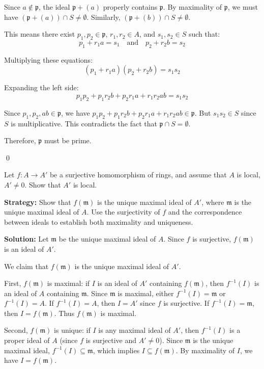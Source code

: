 Since $a \notin \mathfrak{p}$, the ideal $\mathfrak{p} + (a)$ properly contains $\mathfrak{p}$. By maximality of $\mathfrak{p}$, we must have $(\mathfrak{p} + (a)) \cap S \neq \emptyset$. Similarly, $(\mathfrak{p} + (b)) \cap S \neq \emptyset$.

This means there exist $p_1, p_2 \in \mathfrak{p}$, $r_1, r_2 \in A$, and $s_1, s_2 \in S$ such that:
\[ p_1 + r_1a = s_1 \quad \text{and} \quad p_2 + r_2b = s_2 \]

Multiplying these equations:
\[ (p_1 + r_1a)(p_2 + r_2b) = s_1s_2 \]

Expanding the left side:
\[ p_1p_2 + p_1r_2b + p_2r_1a + r_1r_2ab = s_1s_2 \]

Since $p_1, p_2, ab \in \mathfrak{p}$, we have $p_1p_2 + p_1r_2b + p_2r_1a + r_1r_2ab \in \mathfrak{p}$. But $s_1s_2 \in S$ since $S$ is multiplicative. This contradicts the fact that $\mathfrak{p} \cap S = \emptyset$.

Therefore, $\mathfrak{p}$ must be prime.


\qed
\begin{problembox}
Let $f: A \rightarrow A'$ be a surjective homomorphism of rings, and assume that $A$ is local, $A' \neq 0$. Show that $A'$ is local.
\end{problembox}

\noindent\textbf{Strategy:} Show that $f(\mathfrak{m})$ is the unique maximal ideal of $A'$, where $\mathfrak{m}$ is the unique maximal ideal of $A$. Use the surjectivity of $f$ and the correspondence between ideals to establish both maximality and uniqueness.

\noindent\textbf{Solution:}
Let $\mathfrak{m}$ be the unique maximal ideal of $A$. Since $f$ is surjective, $f(\mathfrak{m})$ is an ideal of $A'$.

We claim that $f(\mathfrak{m})$ is the unique maximal ideal of $A'$.

First, $f(\mathfrak{m})$ is maximal: if $I$ is an ideal of $A'$ containing $f(\mathfrak{m})$, then $f^{-1}(I)$ is an ideal of $A$ containing $\mathfrak{m}$. Since $\mathfrak{m}$ is maximal, either $f^{-1}(I) = \mathfrak{m}$ or $f^{-1}(I) = A$. If $f^{-1}(I) = A$, then $I = A'$ since $f$ is surjective. If $f^{-1}(I) = \mathfrak{m}$, then $I = f(\mathfrak{m})$. Thus $f(\mathfrak{m})$ is maximal.

Second, $f(\mathfrak{m})$ is unique: if $I$ is any maximal ideal of $A'$, then $f^{-1}(I)$ is a proper ideal of $A$ (since $f$ is surjective and $A' \neq 0$). Since $\mathfrak{m}$ is the unique maximal ideal, $f^{-1}(I) \subseteq \mathfrak{m}$, which implies $I \subseteq f(\mathfrak{m})$. By maximality of $I$, we have $I = f(\mathfrak{m})$.

